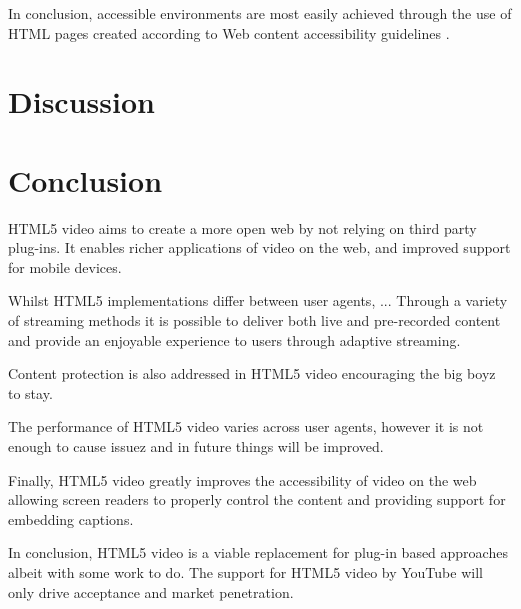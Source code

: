 \documentclass[journal]{IEEEtran}
\begin{document}
In conclusion, accessible environments are most easily achieved through the use of HTML pages created according to Web content accessibility guidelines \cite{incollection:accessibilityEvaluationForMultimediaContent}.

\section{Discussion}


\section{Conclusion}
HTML5 video aims to create a more open web by not relying on third party plug-ins. It enables richer applications of video on the web, and improved support for mobile devices. %

Whilst HTML5 implementations differ between user agents, ... %
Through a variety of streaming methods it is possible to deliver both live and pre-recorded content and provide an enjoyable experience to users through adaptive streaming.

Content protection is also addressed in HTML5 video encouraging the big boyz to stay. %

The performance of HTML5 video varies across user agents, however it is not enough to cause issuez and in future things will be improved. %

Finally, HTML5 video greatly improves the accessibility of video on the web allowing screen readers to properly control the content and providing support for embedding captions.

In conclusion, HTML5 video is a viable replacement for plug-in based approaches albeit with some work to do. The support for HTML5 video by YouTube %
will only drive acceptance and market penetration. %


%
%
\end{document}
